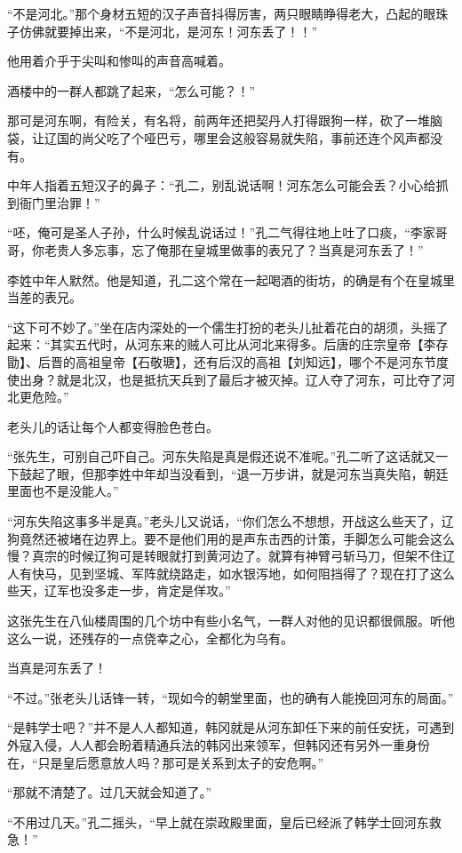 “不是河北。”那个身材五短的汉子声音抖得厉害，两只眼睛睁得老大，凸起的眼珠子仿佛就要掉出来，“不是河北，是河东！河东丢了！！”

他用着介乎于尖叫和惨叫的声音高喊着。

酒楼中的一群人都跳了起来，“怎么可能？！”

那可是河东啊，有险关，有名将，前两年还把契丹人打得跟狗一样，砍了一堆脑袋，让辽国的尚父吃了个哑巴亏，哪里会这般容易就失陷，事前还连个风声都没有。

中年人指着五短汉子的鼻子：“孔二，别乱说话啊！河东怎么可能会丢？小心给抓到衙门里治罪！”

“呸，俺可是圣人子孙，什么时候乱说话过！”孔二气得往地上吐了口痰，“李家哥哥，你老贵人多忘事，忘了俺那在皇城里做事的表兄了？当真是河东丢了！”

李姓中年人默然。他是知道，孔二这个常在一起喝酒的街坊，的确是有个在皇城里当差的表兄。

“这下可不妙了。”坐在店内深处的一个儒生打扮的老头儿扯着花白的胡须，头摇了起来：“其实五代时，从河东来的贼人可比从河北来得多。后唐的庄宗皇帝【李存勖】、后晋的高祖皇帝【石敬瑭】，还有后汉的高祖【刘知远】，哪个不是河东节度使出身？就是北汉，也是抵抗天兵到了最后才被灭掉。辽人夺了河东，可比夺了河北更危险。”

老头儿的话让每个人都变得脸色苍白。

“张先生，可别自己吓自己。河东失陷是真是假还说不准呢。”孔二听了这话就又一下鼓起了眼，但那李姓中年却当没看到，“退一万步讲，就是河东当真失陷，朝廷里面也不是没能人。”

“河东失陷这事多半是真。”老头儿又说话，“你们怎么不想想，开战这么些天了，辽狗竟然还被堵在边界上。要不是他们用的是声东击西的计策，手脚怎么可能会这么慢？真宗的时候辽狗可是转眼就打到黄河边了。就算有神臂弓斩马刀，但架不住辽人有快马，见到坚城、军阵就绕路走，如水银泻地，如何阻挡得了？现在打了这么些天，辽军也没多走一步，肯定是佯攻。”

这张先生在八仙楼周围的几个坊中有些小名气，一群人对他的见识都很佩服。听他这么一说，还残存的一点侥幸之心，全都化为乌有。

当真是河东丢了！

“不过。”张老头儿话锋一转，“现如今的朝堂里面，也的确有人能挽回河东的局面。”

“是韩学士吧？”并不是人人都知道，韩冈就是从河东卸任下来的前任安抚，可遇到外寇入侵，人人都会盼着精通兵法的韩冈出来领军，但韩冈还有另外一重身份在，“只是皇后愿意放人吗？那可是关系到太子的安危啊。”

“那就不清楚了。过几天就会知道了。”

“不用过几天。”孔二摇头，“早上就在崇政殿里面，皇后已经派了韩学士回河东救急！”

